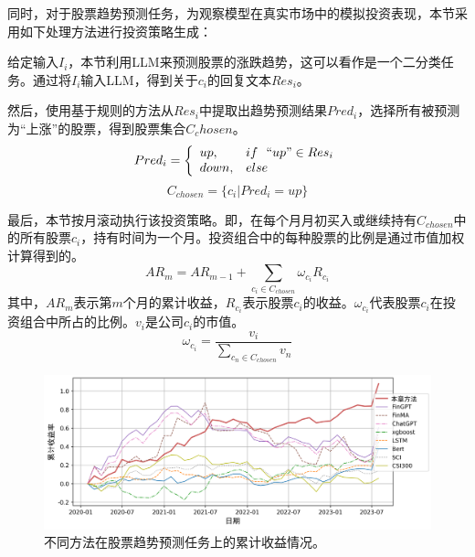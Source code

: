 同时，对于股票趋势预测任务，为观察模型在真实市场中的模拟投资表现，本节采用如下处理方法进行投资策略生成：

给定输入$I_i$，本节利用LLM来预测股票的涨跌趋势，这可以看作是一个二分类任务。通过将$I_i$输入LLM，得到关于$c_i$的回复文本$Res_i$。

然后，使用基于规则的方法从$Res_i$中提取出趋势预测结果$Pred_i$，选择所有被预测为“上涨”的股票，得到股票集合$C_chosen$。
\begin{equation}
    Pred_i = \left\{ 
        \begin{array}{ll}
            up, & if\ \ ``up" \in Res_i \\
            down, & else \\
        \end{array}
    \right.
\end{equation}
\begin{equation}
	C_{chosen}= \{c_i | Pred_i = up\}
\end{equation}

最后，本节按月滚动执行该投资策略。即，在每个月月初买入或继续持有$C_{chosen}$中的所有股票$c_i$，持有时间为一个月。投资组合中的每种股票的比例是通过市值加权计算得到的。
\begin{equation}
	AR_m = AR_{m-1} + \sum_{c_i \in C_{chosen}}\omega_{c_i} R_{c_i}
\end{equation}
其中，$AR_m$表示第$m$个月的累计收益，$R_{c_i}$表示股票$c_i$的收益。$\omega_{c_i}$代表股票$c_i$在投资组合中所占的比例。$v_i$是公司$c_i$的市值。
\begin{equation}
	\omega_{c_i} = \frac{v_i}{\sum_{c_n \in C_{chosen}}v_n}
\end{equation}

\begin{figure}[htbp]
	\centering
	\includegraphics[scale=0.54]{Fig/stock_trend_exp.png}
	\caption{\label{stock_trend_exp}不同方法在股票趋势预测任务上的累计收益情况。}
\end{figure}

